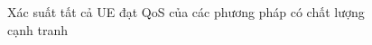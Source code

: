 \begin{figure}[htbp]
\centering
\resizebox{0.95\textwidth}{!}{}
\caption{Xác suất tất cả UE đạt QoS của các phương pháp có chất lượng cạnh tranh}
\label{fig:ch4-qos}
\end{figure}
